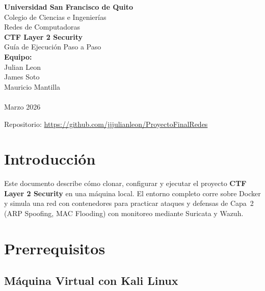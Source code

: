 \documentclass[12pt,a4paper]{article}
\begin{document}
\begin{titlepage}
    \centering
    \vspace*{2cm}

    {\LARGE\textbf{Universidad San Francisco de Quito}}\\[0.5cm]
    {\large Colegio de Ciencias e Ingenier\'ias}\\[0.3cm]
    {\large Redes de Computadoras}\\[2.5cm]

    {\Huge\textbf{CTF Layer 2 Security}}\\[0.5cm]
    {\LARGE Gu\'ia de Ejecuci\'on Paso a Paso}\\[3cm]

    {\Large\textbf{Equipo:}}\\[0.5cm]
    {\large
        Julian Leon\\
        James Soto\\
        Mauricio Mantilla\\
    }\\[2.5cm]

    {\large Marzo 2026}

    \vfill
    {\small Repositorio: \url{https://github.com/jjjulianleon/ProyectoFinalRedes}}
\end{titlepage}

\tableofcontents
\newpage

\section{Introducci\'on}

Este documento describe c\'omo clonar, configurar y ejecutar el proyecto \textbf{CTF Layer 2 Security} en una m\'aquina local. El entorno completo corre sobre Docker y simula una red con contenedores para practicar ataques y defensas de Capa~2 (ARP Spoofing, MAC Flooding) con monitoreo mediante Suricata y Wazuh.

\section{Prerrequisitos}

\subsection{M\'aquina Virtual con Kali Linux}
\end{document}
